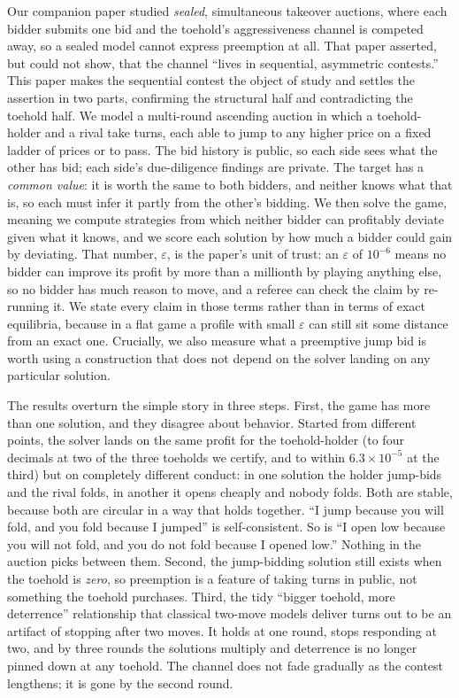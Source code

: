 \documentclass[11pt,a4paper]{article}
\begin{document}
Our companion paper \citep{naboulsi2026diligence} studied \emph{sealed}, simultaneous takeover auctions, where each bidder submits one bid and the toehold's aggressiveness channel is competed away, so a sealed model cannot express preemption at all. That paper asserted, but could not show, that the channel ``lives in sequential, asymmetric contests.'' This paper makes the sequential contest the object of study and settles the assertion in two parts, confirming the structural half and contradicting the toehold half. We model a multi-round ascending auction in which a toehold-holder and a rival take turns, each able to jump to any higher price on a fixed ladder of prices or to pass. The bid history is public, so each side sees what the other has bid; each side's due-diligence findings are private. The target has a \emph{common value}: it is worth the same to both bidders, and neither knows what that is, so each must infer it partly from the other's bidding. We then solve the game, meaning we compute strategies from which neither bidder can profitably deviate given what it knows, and we score each solution by how much a bidder could gain by deviating. That number, $\varepsilon$, is the paper's unit of trust: an $\varepsilon$ of $10^{-6}$ means no bidder can improve its profit by more than a millionth by playing anything else, so no bidder has much reason to move, and a referee can check the claim by re-running it. We state every claim in those terms rather than in terms of exact equilibria, because in a flat game a profile with small $\varepsilon$ can still sit some distance from an exact one. Crucially, we also measure what a preemptive jump bid is worth using a construction that does not depend on the solver landing on any particular solution.

The results overturn the simple story in three steps. First, the game has more than one solution, and they disagree about behavior. Started from different points, the solver lands on the same profit for the toehold-holder (to four decimals at two of the three toeholds we certify, and to within $6.3\times10^{-5}$ at the third) but on completely different conduct: in one solution the holder jump-bids and the rival folds, in another it opens cheaply and nobody folds. Both are stable, because both are circular in a way that holds together. ``I jump because you will fold, and you fold because I jumped'' is self-consistent. So is ``I open low because you will not fold, and you do not fold because I opened low.'' Nothing in the auction picks between them. Second, the jump-bidding solution still exists when the toehold is \emph{zero}, so preemption is a feature of taking turns in public, not something the toehold purchases. Third, the tidy ``bigger toehold, more deterrence'' relationship that classical two-move models deliver turns out to be an artifact of stopping after two moves. It holds at one round, stops responding at two, and by three rounds the solutions multiply and deterrence is no longer pinned down at any toehold. The channel does not fade gradually as the contest lengthens; it is gone by the second round.
\end{document}

